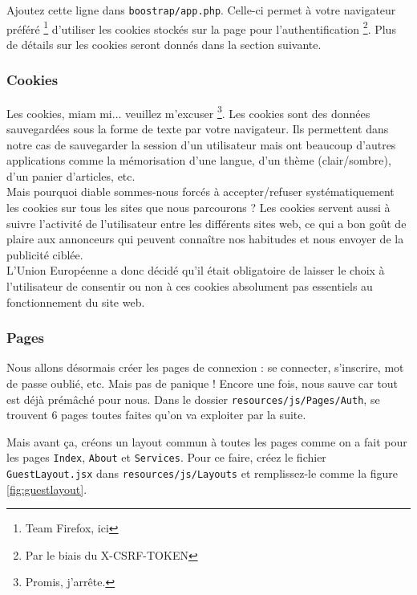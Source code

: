 Ajoutez cette ligne dans \linebreak \verb|boostrap/app.php|. Celle-ci permet à votre navigateur préféré \footnote{Team Firefox, ici} d'utiliser les cookies stockés sur la page pour l'authentification \footnote{Par le biais du X-CSRF-TOKEN}. Plus de détails sur les cookies seront donnés dans la section suivante.

\subsubsection[Cookies]{Cookies}

Les cookies, miam mi... veuillez m'excuser \footnote{Promis, j'arrête.}. Les cookies sont des données sauvegardées sous la forme de texte par votre navigateur. Ils permettent dans notre cas de sauvegarder la session d'un utilisateur mais ont beaucoup d'autres applications comme la mémorisation d'une langue, d'un thème (clair/sombre), d'un panier d'articles, etc. \\

Mais pourquoi diable sommes-nous forcés à accepter/refuser systématiquement les cookies sur tous les sites que nous parcourons ? Les cookies servent aussi à suivre l'activité de l'utilisateur entre les différents sites web, ce qui a bon goût de plaire aux annonceurs qui peuvent connaître nos habitudes et nous envoyer de la publicité ciblée. \\

L'Union Européenne a donc décidé qu'il était obligatoire de laisser le choix à l'utilisateur de consentir ou non à ces cookies absolument pas essentiels au fonctionnement du site web.


\subsubsection[Pages]{Pages} \label{sec:auth_pages}

Nous allons désormais créer les pages de connexion : se connecter, s'inscrire, mot de passe oublié, etc. Mais pas de panique ! Encore une fois, \laravel nous sauve car tout est déjà prémâché pour nous. Dans le dossier \texttt{resources/js/Pages/Auth}, se trouvent 6 pages toutes faites qu'on va exploiter par la suite.



Mais avant ça, créons un layout commun à toutes les pages comme on a fait pour les pages \texttt{Index}, \texttt{About} et \texttt{Services}. Pour ce faire, créez le fichier \texttt{GuestLayout.jsx} dans \texttt{resources/js/Layouts} et remplissez-le comme la figure \ref{fig:guestlayout}.

